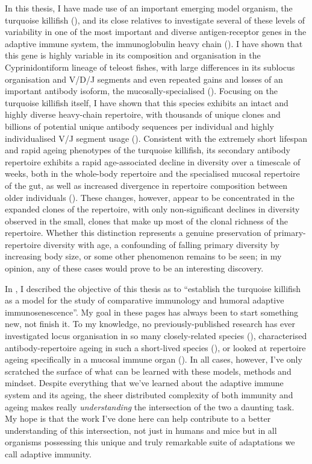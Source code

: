 In this thesis, I have made use of an important emerging model organism, the turquoise killifish (\nfu), and its close relatives to investigate several of these levels of variability in one of the most important and diverse antigen-receptor genes in the adaptive immune system, the immunoglobulin heavy chain (\igh{}). I have shown that this gene is highly variable in its composition and organisation in the Cyprinidontiform lineage of teleost fishes, with large differences in its sublocus organisation and V/D/J segments and even repeated gains and losses of an important antibody isoform, the mucosally-specialised  (). Focusing on the turquoise killifish itself, I have shown that this species exhibits an intact and highly diverse heavy-chain repertoire, with thousands of unique clones and billions of potential unique antibody sequences per individual and highly individualised V/J segment usage (). Consistent with the extremely short lifespan and rapid ageing phenotypes of the turquoise killifish, its secondary antibody repertoire exhibits a rapid age-associated decline in diversity over a timescale of weeks, both in the whole-body repertoire and the specialised mucosal repertoire of the gut, as well as increased divergence in repertoire composition between older individuals (). These changes, however, appear to be concentrated in the expanded clones of the repertoire, with only non-significant declines in diversity observed in the small, \naive clones that make up most of the clonal richness of the repertoire. Whether this distinction represents a genuine preservation of primary-repertoire diversity with age, a confounding of falling primary diversity by increasing body size, or some other phenomenon remains to be seen; in my opinion, any of these cases would prove to be an interesting discovery.

In , I described the objective of this thesis as to ``establish the turquoise killifish as a model for the study of comparative immunology and humoral adaptive immunosenescence''. My goal in these pages has always been to start something new, not finish it. To my knowledge, no previously-published research has ever investigated \igh{} locus organisation in so many closely-related species (), characterised antibody-repertoire ageing in such a short-lived species (), or looked at repertoire ageing specifically in a mucosal immune organ (). In all cases, however, I've only scratched the surface of what can be learned with these models, methods and mindset. Despite everything that we've learned about the adaptive immune system and its ageing, the sheer distributed complexity of both immunity and ageing makes really \textit{understanding} the intersection of the two a daunting task. My hope is that the work I've done here can help contribute to a better understanding of this intersection, not just in humans and mice but in all organisms possessing this unique and truly remarkable suite of adaptations we call adaptive immunity.